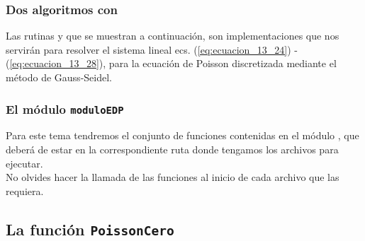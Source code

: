 \documentclass[12pt]{beamer}
\begin{document}
\begin{frame}
\frametitle{Dos algoritmos con \python}
Las rutinas  y  que se muestran a continuación, son implementaciones que nos servirán para resolver el sistema lineal ecs. (\ref{eq:ecuacion_13_24}) - (\ref{eq:ecuacion_13_28}), para la ecuación de Poisson discretizada mediante el método de Gauss-Seidel.
\end{frame}
\begin{frame}
\frametitle{El módulo \texttt{moduloEDP}}
Para este tema tendremos el conjunto de funciones contenidas en el módulo , que deberá de estar en la correspondiente ruta donde tengamos los archivos para ejecutar.
\\
\bigskip
\pause
No olvides hacer la llamada de las funciones al inicio de cada archivo que las requiera.
\end{frame}

\subsection{La función \texttt{PoissonCero}}
\end{document}

